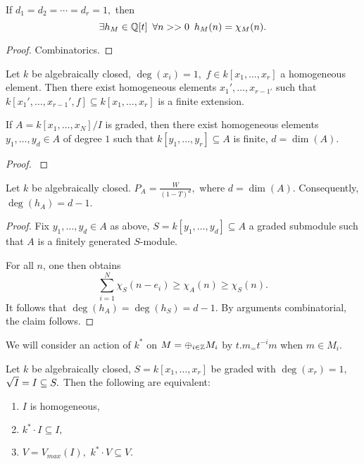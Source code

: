 \begin{corollary}
  If \(d_1 = d_2 = \dotsb = d_r = 1,\) then
  \[\exists h_M \in \mathbb Q[t] \enspace \forall n >> 0 \enspace h_M(n) = \chi_M(n).\]
\end{corollary}
\begin{proof}
  Combinatorics.
\end{proof}


\begin{prop}
  Let \(k\) be algebraically closed, \(\deg(x_i) = 1,\) \(f \in k[x_1, \dotsc, x_r]\) a homogeneous element. Then there exist homogeneous elements
  \(x_1', \dotsc, x_{r-1'}\)
  such that
  \(k[x_1', \dotsc, x_{r-1}', f] \subseteq k[x_1, \dotsc, x_r]\) is a finite extension.
\end{prop}

\begin{corollary}
  If \(A = k[x_1, \dotsc, x_N] / {I}\) is graded, then there exist homogeneous elements \(y_1, \dotsc, y_d \in A\) of degree \(1\) such that
  \(k[y_1, \dotsc, y_r] \subseteq A\) is finite, \(d = \dim(A).\)
\end{corollary}
\begin{proof}
\cite{eisenbud1995commutative}
\end{proof}


\begin{theorem}
  Let \(k\) be algebraically closed.
  \(P_A = \frac{W}{(1-T)^d},\) where \(d = \dim(A).\) Consequently, \(\deg(h_A) = d - 1.\)
\end{theorem}
\begin{proof}
  Fix \(y_1, \dotsc, y_d \in A\) as above, \(S = k[y_1, \dotsc, y_d] \subseteq A\) a graded submodule such that \(A\) is a finitely generated \(S\)-module.

  For all \(n\), one then obtains
  \[\sum_{i=1}^N \chi_S(n - e_i) \geq \chi_A(n) \geq \chi_S(n).\]
  It follows that \(\deg(h_A) = \deg(h_S) = d-1.\)
  By arguments combinatorial, the claim follows.
\end{proof}

We will consider an action of \(k^*\) on \(M = \oplus_{i \in \mathbb Z} M_i\) by \(t . m_ = t^{-i} m\) when \(m \in M_i.\)

\begin{prop}
  \label{homogeneous Nullstellensatz}
  Let \(k\) be algebraically closed, \(S = k[x_1, \dotsc, x_r]\) be graded with \(\deg(x_r) = 1,\) \(\sqrt{I} = I \subseteq S.\) Then the following are equivalent:
  \begin{enumerate}
  \item \(I\) is homogeneous,
  \item \(k^* \cdot I \subseteq I,\)
  \item \(V = V_{max}(I),\) \(k^* \cdot V \subseteq V.\)
  \end{enumerate}
\end{prop}

